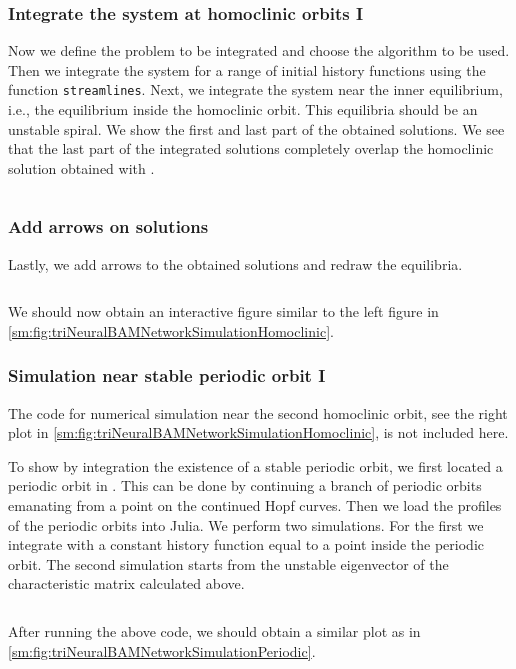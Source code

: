 \subsubsection{Integrate the system at homoclinic orbits I}
Now we define the problem to be integrated and choose the algorithm to be used.
Then we integrate the system for a range of initial history functions using the
function \texttt{streamlines}. Next, we integrate the system near
the inner equilibrium, i.e., the equilibrium inside the homoclinic orbit. This
equilibria should be an unstable spiral. We show the first and last part
of the obtained solutions. We see that the last part of the integrated solutions
completely overlap the homoclinic solution obtained with \DDEBIFTOOL.
\inputminted[firstline=142, lastline=165]{julia}{\pathToJuliaFiles/triNeuralBAMNetworkModel_simulation_article.jl}

\subsubsection{Add arrows on solutions}
Lastly, we add arrows to the obtained solutions and redraw the equilibria.
\inputminted[firstline=167, lastline=178]{julia}{\pathToJuliaFiles/triNeuralBAMNetworkModel_simulation_article.jl}
We should now obtain an interactive figure similar to the left figure in
\cref{sm:fig:triNeuralBAMNetworkSimulationHomoclinic}.

\subsubsection{Simulation near stable periodic orbit I}
The code for numerical simulation near the second homoclinic orbit, see the
right plot in \cref{sm:fig:triNeuralBAMNetworkSimulationHomoclinic}, is not
included here.

To show by integration the existence of a stable periodic orbit, we first
located a periodic orbit in \DDEBIFTOOL. This can be done by continuing a
branch of periodic orbits emanating from a point on the continued Hopf curves.
Then we load the profiles of the periodic orbits into Julia. We perform two
simulations. For the first we integrate with a constant history function equal
to a point inside the periodic orbit. The second simulation starts from the
unstable eigenvector of the characteristic matrix calculated above.
\inputminted[firstline=237, lastline=328]{julia}{\pathToJuliaFiles/triNeuralBAMNetworkModel_simulation_article.jl}
After running the above code, we should obtain a similar plot as in
\cref{sm:fig:triNeuralBAMNetworkSimulationPeriodic}.

